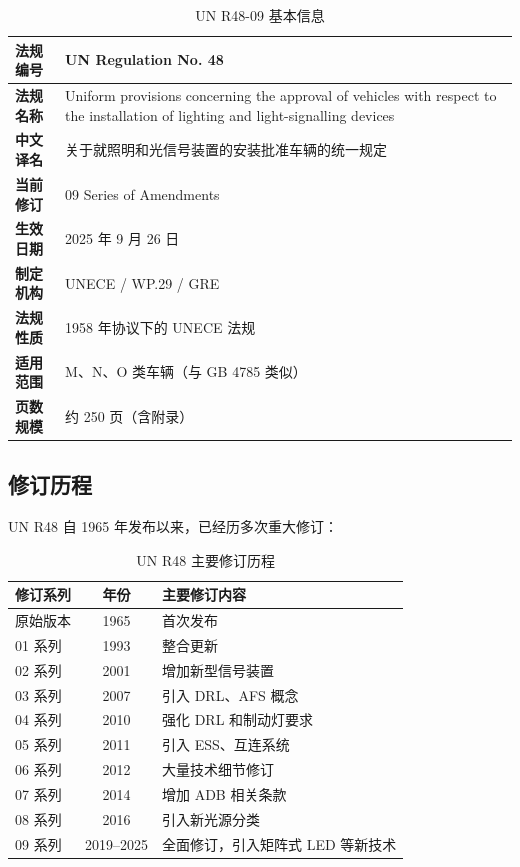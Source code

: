 \begin{table}[H]
\centering
\caption{UN R48-09 基本信息}
\begin{tabularx}{\textwidth}{|l|X|}
\hline
\textbf{法规编号} & UN Regulation No. 48 \\
\hline
\textbf{法规名称} & Uniform provisions concerning the approval of vehicles with respect to the installation of lighting and light-signalling devices \\
\hline
\textbf{中文译名} & 关于就照明和光信号装置的安装批准车辆的统一规定 \\
\hline
\textbf{当前修订} & 09 Series of Amendments \\
\hline
\textbf{生效日期} & 2025 年 9 月 26 日 \\
\hline
\textbf{制定机构} & UNECE / WP.29 / GRE \\
\hline
\textbf{法规性质} & 1958 年协议下的 UNECE 法规 \\
\hline
\textbf{适用范围} & M、N、O 类车辆（与 GB 4785 类似） \\
\hline
\textbf{页数规模} & 约 250 页（含附录） \\
\hline
\end{tabularx}
\end{table}

\subsection{修订历程}

UN R48 自 1965 年发布以来，已经历多次重大修订：

\begin{table}[H]
\centering
\caption{UN R48 主要修订历程}
\begin{tabular}{|l|c|p{8cm}|}
\hline
\textbf{修订系列} & \textbf{年份} & \textbf{主要修订内容} \\
\hline
原始版本    & 1965  & 首次发布 \\
\hline
01 系列     & 1993  & 整合更新 \\
\hline
02 系列     & 2001  & 增加新型信号装置 \\
\hline
03 系列     & 2007  & 引入 DRL、AFS 概念 \\
\hline
04 系列     & 2010  & 强化 DRL 和制动灯要求 \\
\hline
05 系列     & 2011  & 引入 ESS、互连系统 \\
\hline
06 系列     & 2012  & 大量技术细节修订 \\
\hline
07 系列     & 2014  & 增加 ADB 相关条款 \\
\hline
08 系列     & 2016  & 引入新光源分类 \\
\hline
09 系列     & 2019--2025 & 全面修订，引入矩阵式 LED 等新技术 \\
\hline
\end{tabular}
\end{table}

